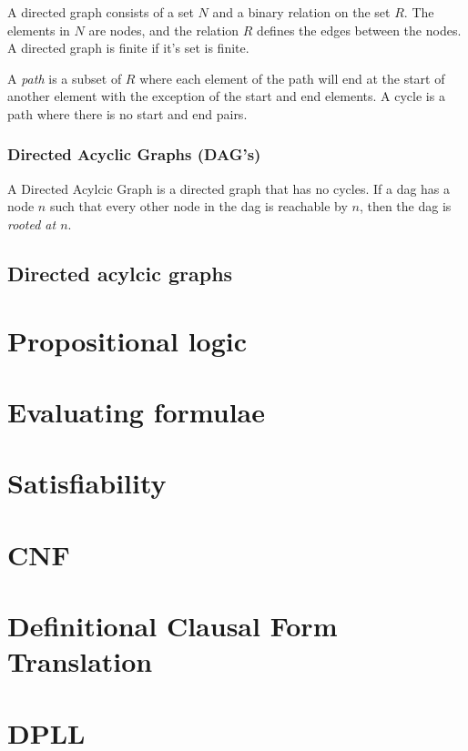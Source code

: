 A directed graph consists of a set $N$ and a binary relation on the set $R$. The
elements in $N$ are nodes, and the relation $R$ defines the edges between the
nodes. A directed graph is finite if it's set is finite.

A \textit{path} is a subset of $R$ where each element of the path will end at
the start of another element with the exception of the start and end elements. A
cycle is a path where there is no start and end pairs.

\subsubsection{Directed Acyclic Graphs (DAG's)}

A Directed Acylcic Graph is a directed graph that has no cycles. If a dag has a
node $n$ such that every other node in the dag is reachable by $n$, then the dag
is \textit{rooted at $n$}.

\subsection{Directed acylcic graphs}



\section{Propositional logic}

\section{Evaluating formulae}

\section{Satisfiability}

\section{CNF}

\section{Definitional Clausal Form Translation}

\section{DPLL}

